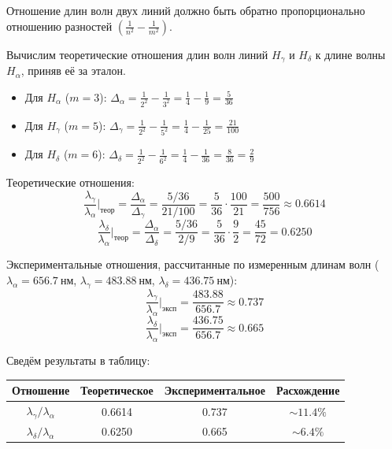 \documentclass[a4paper,12pt]{article}
\begin{document}
\begin{enumerate}
    Отношение длин волн двух линий должно быть обратно пропорционально отношению разностей $\left( \frac{1}{n^2} - \frac{1}{m^2} \right)$.
    
    Вычислим теоретические отношения длин волн линий $H_\gamma$ и $H_\delta$ к длине волны $H_\alpha$, приняв её за эталон.
    
    \begin{itemize}
        \item Для $H_\alpha$ ($m=3$): $\Delta_{\alpha} = \frac{1}{2^2} - \frac{1}{3^2} = \frac{1}{4} - \frac{1}{9} = \frac{5}{36}$
        \item Для $H_\gamma$ ($m=5$): $\Delta_{\gamma} = \frac{1}{2^2} - \frac{1}{5^2} = \frac{1}{4} - \frac{1}{25} = \frac{21}{100}$
        \item Для $H_\delta$ ($m=6$): $\Delta_{\delta} = \frac{1}{2^2} - \frac{1}{6^2} = \frac{1}{4} - \frac{1}{36} = \frac{8}{36} = \frac{2}{9}$
    \end{itemize}
    
    Теоретические отношения:
    $$
    \frac{\lambda_\gamma}{\lambda_\alpha} \bigg|_{\text{теор}} = \frac{\Delta_{\alpha}}{\Delta_{\gamma}} = \frac{5/36}{21/100} = \frac{5}{36} \cdot \frac{100}{21} = \frac{500}{756} \approx 0.6614
    $$
    $$
    \frac{\lambda_\delta}{\lambda_\alpha} \bigg|_{\text{теор}} = \frac{\Delta_{\alpha}}{\Delta_{\delta}} = \frac{5/36}{2/9} = \frac{5}{36} \cdot \frac{9}{2} = \frac{45}{72} = 0.6250
    $$
    
    Экспериментальные отношения, рассчитанные по измеренным длинам волн ($\lambda_\alpha = 656.7\ \text{нм}$, $\lambda_\gamma = 483.88\ \text{нм}$, $\lambda_\delta = 436.75\ \text{нм}$):
    $$
    \frac{\lambda_\gamma}{\lambda_\alpha} \bigg|_{\text{эксп}} = \frac{483.88}{656.7} \approx 0.737
    $$
    $$
    \frac{\lambda_\delta}{\lambda_\alpha} \bigg|_{\text{эксп}} = \frac{436.75}{656.7} \approx 0.665
    $$
    
    Сведём результаты в таблицу:
    
    \begin{table}[h!]
    \centering
    \begin{tabular}{||c|c|c|c||}
    \hline
    Отношение & Теоретическое & Экспериментальное & Расхождение \\ 
    \hline
    \hline
    $\lambda_\gamma / \lambda_\alpha$ & 0.6614 & 0.737 & $\sim 11.4\%$ \\ \hline
    $\lambda_\delta / \lambda_\alpha$ & 0.6250 & 0.665 & $\sim 6.4\%$ \\ \hline
    \end{tabular}
    \end{table}


\end{enumerate}
\end{document}
